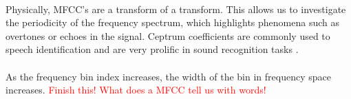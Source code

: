 \documentclass[12pt,letterpaper]{article}
\begin{document}
\paragraph*{}Physically, MFCC's are a transform of a transform. This allows us to investigate the periodicity of the frequency spectrum, which highlights phenomena such as overtones or echoes in the signal\cite{Virtanen}. Ceptrum coefficients are commonly used to speech identification and are very prolific in sound recognition tasks \cite{Serizel,Sahidullah,Liu}. 

\paragraph*{}As the frequency bin index increases, the width of the bin in frequency space increases. \textcolor{red}{Finish this! What does a MFCC tell us with words!}
\end{document}

